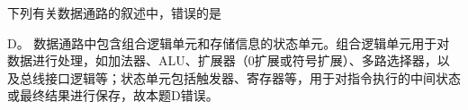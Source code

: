 \question 下列有关数据通路的叙述中，错误的是
\par{}
\begin{solution}D。
数据通路中包含组合逻辑单元和存储信息的状态单元。组合逻辑单元用于对数据进行处理，如加法器、ALU、扩展器（0扩展或符号扩展）、多路选择器，以及总线接口逻辑等；状态单元包括触发器、寄存器等，用于对指令执行的中间状态或最终结果进行保存，故本题D错误。
\end{solution}
